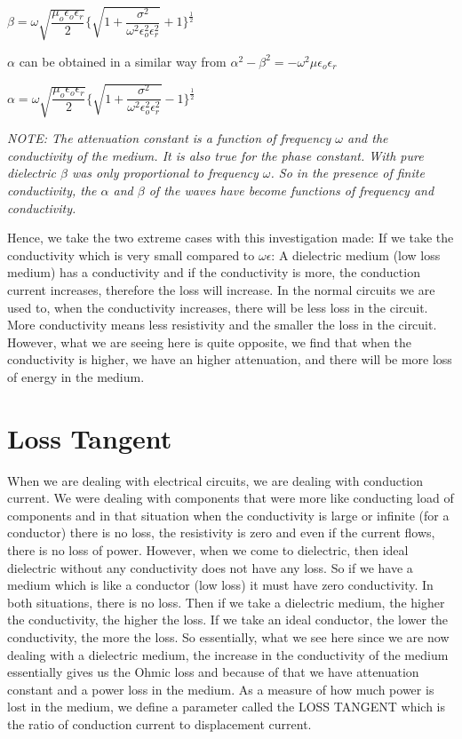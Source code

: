 \begin{center}
$\beta = \omega\sqrt{\dfrac{\mu_{o}\epsilon_{o}\epsilon_{r}}{2}}\Bigg\{{\sqrt{1 + \dfrac{\sigma^{2}}{\omega^{2}\epsilon_{o}^{2}\epsilon_{r}^{2}}}} + 1\Bigg\}^{\frac{1}{2}}$
\end{center}

$\alpha$ can be obtained in a similar way from $\alpha^{2} - \beta^{2} = -\omega^{2}\mu\epsilon_{o}\epsilon_{r}$

\begin{center}
$\alpha = \omega\sqrt{\dfrac{\mu_{o}\epsilon_{o}\epsilon_{r}}{2}}\Bigg\{{\sqrt{1 + \dfrac{\sigma^{2}}{\omega^{2}\epsilon_{o}^{2}\epsilon_{r}^{2}}}} - 1\Bigg\}^{\frac{1}{2}}$
\end{center}

\textit{NOTE: The attenuation constant is a function of frequency $\omega$ and the conductivity of the medium. It is also true for the phase constant. With pure dielectric $\beta$ was only proportional to frequency $\omega$. So in the presence of finite conductivity, the $\alpha$ and $\beta$ of the waves have become functions of frequency and conductivity.}

Hence, we take the two extreme cases with this investigation made:
If we take the conductivity which is very small compared to $\omega\epsilon$: A dielectric medium (low loss medium) has a conductivity and if the conductivity is more, the conduction current increases, therefore the loss will increase. In the normal circuits we are used to, when the conductivity increases, there will be less loss in the circuit. More conductivity means less resistivity and the smaller the loss in the circuit. However, what we are seeing here is quite opposite, we find that when the conductivity is higher, we have an higher attenuation, and there will be more loss of energy in the medium.

\section{Loss Tangent}

When we are dealing with electrical circuits, we are dealing with conduction current. We were dealing with components that were more like conducting load of components and in that situation when the conductivity is large or infinite (for a conductor) there is no loss, the resistivity is zero and even if the current flows, there is no loss of power.
However, when we come to dielectric, then ideal dielectric without any conductivity does not have any loss. So if we have a medium which is like a conductor (low loss) it must have zero conductivity. In both situations, there is no loss. Then if we take a dielectric medium, the higher the conductivity, the higher the loss. If we take an ideal conductor, the lower the conductivity, the more the loss. So essentially, what we see here since we are now dealing with a dielectric medium, the increase in the conductivity of the medium essentially gives us the Ohmic loss and because of that we have attenuation constant and a power loss in the medium.
As a measure of how much power is lost in the medium, we define a parameter called the LOSS TANGENT which is the ratio of conduction current to displacement current.

